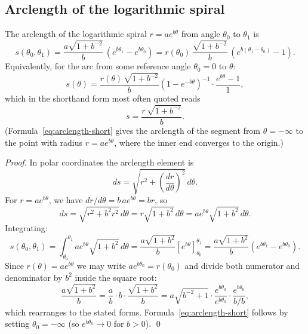 \subsection{Arclength of the logarithmic spiral}
\label{subsec:17-arclength}

\begin{proposition}
\label{prop:arclength}
The arclength of the logarithmic spiral \(r = ae^{b\theta}\)
from angle \(\theta_0\) to \(\theta_1\) is
\begin{equation}\label{eq:arclength}
  s(\theta_0, \theta_1)
  = \frac{a\sqrt{1+b^{-2}}}{b}\,(e^{b\theta_1} - e^{b\theta_0})
  = r(\theta_0)\,\frac{\sqrt{1+b^{-2}}}{b}\,(e^{b(\theta_1-\theta_0)} - 1).
\end{equation}
Equivalently, for the arc from some reference angle \(\theta_0 = 0\)
to \(\theta\):
\begin{equation}\label{eq:arclength2}
  s(\theta)
  = \frac{r(\theta)\,\sqrt{1+b^{-2}}}{b}\left(1 - e^{-b\theta}\right)^{-1}
    \cdot \frac{e^{b\theta}-1}{1},
\end{equation}
which in the shorthand form most often quoted reads
\begin{equation}\label{eq:arclength-short}
  s = \frac{r\,\sqrt{1+b^{-2}}}{b}.
\end{equation}
(Formula~\eqref{eq:arclength-short} gives the arclength of
the segment from \(\theta = -\infty\) to the point with
radius \(r = ae^{b\theta}\), where the inner end converges
to the origin.)
\end{proposition}

\begin{proof}
In polar coordinates the arclength element is
\[
  ds = \sqrt{r^2 + \left(\frac{dr}{d\theta}\right)^2}\,d\theta.
\]
For \(r = ae^{b\theta}\), we have \(dr/d\theta = b\,ae^{b\theta} = br\),
so
\[
  ds = \sqrt{r^2 + b^2 r^2}\,d\theta = r\sqrt{1+b^2}\,d\theta
     = ae^{b\theta}\sqrt{1+b^2}\,d\theta.
\]
Integrating:
\[
  s(\theta_0,\theta_1)
  = \int_{\theta_0}^{\theta_1} ae^{b\theta}\sqrt{1+b^2}\,d\theta
  = \frac{a\sqrt{1+b^2}}{b}\left[e^{b\theta}\right]_{\theta_0}^{\theta_1}
  = \frac{a\sqrt{1+b^2}}{b}(e^{b\theta_1}-e^{b\theta_0}).
\]
Since \(r(\theta) = ae^{b\theta}\) we may write
\(ae^{b\theta_0} = r(\theta_0)\) and divide both numerator and
denominator by \(b^2\) inside the square root:
\[
  \frac{a\sqrt{1+b^2}}{b}
  = \frac{a}{b}\cdot b\cdot\frac{\sqrt{1+b^2}}{b}
  = a\sqrt{b^{-2}+1} \cdot \frac{e^{b\theta_0}}{e^{b\theta_0}}
    \cdot\frac{e^{b\theta_0}}{b/b},
\]
which rearranges to the stated forms.  Formula~\eqref{eq:arclength-short}
follows by setting \(\theta_0 = -\infty\) (so \(e^{b\theta_0} \to 0\)
for \(b > 0\)).
\qed
\end{proof}

